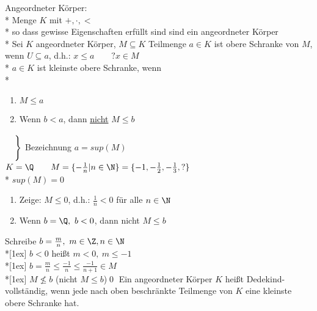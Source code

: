 Angeordneter Körper:\\*
Menge $K$ mit $+, ·, <$\\*
so dass gewisse Eigenschaften erfüllt sind
\bsp
\Q{} sind ein angeordneter Körper\\*
Sei $K$ angeordneter Körper, $M\subseteq K$ Teilmenge $a\in K$ ist obere Schranke von $M$, wenn $U\subseteq a$, d.h.: $x\leq a\qquad ?x\in M$\\*
$a\in K$ ist kleinste obere Schranke, wenn\\*
\begin{enumerate}
\item{$M\leq a$}
\item{Wenn $b < a$, dann \ul{nicht} $M\leq b$}
\end{enumerate}
\vspace*{-9.5ex}\hspace*{15.5em}
$\left.
\begin{array}{l}
{}\vspace*{2ex}\\*{}
\end{array}
\right\}$
\vspace*{-5ex}Bezeichnung $a=sup(M)$
\vspace*{5ex}
%
\bsp
$K=\Q\qquad M=\{-\frac{1}{n}|n\in\N\}=\{-1,-\frac{1}{2},-\frac{1}{3},?\}$\\*
$sup(M)=0$
\bew
\begin{enumerate}
\item {Zeige: $M \leq 0$, d.h.: $\frac{1}{n}<0$ für alle $n\in\N$\ok}
\item {Wenn $b=\Q,\ b<0$, dann nicht $M\leq b$}
\end{enumerate}
Schreibe $b=\frac{m}{n},\ m\in\Z, n\in\N$\\*[1ex]
$b<0$ heißt $m<0,\ m\leq -1$\\*[1ex]
$b=\frac{m}{n} \leq \frac{-1}{n} \leq \frac{-1}{n+1}\in M$\\*[1ex]
\Rarr{} $M\not\leq b$ (nicht $M\leq b$)\qed
%
\Def
Ein angeordneter Körper $K$ heißt Dedekind-vollständig, wenn jede nach oben beschränkte Teilmenge von $K$ eine kleinste obere Schranke hat.
